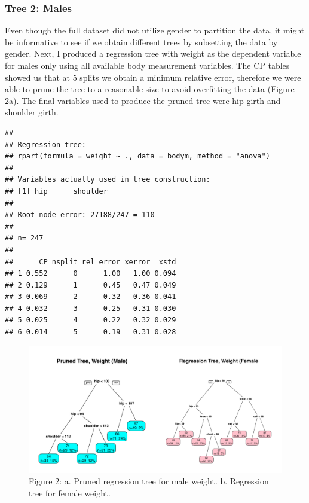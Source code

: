 \documentclass[11pt]{article}\usepackage[]{graphicx}\usepackage[]{color}
\makeatletter
\def\maxwidth{ %
  \ifdim\Gin@nat@width>\linewidth
    \linewidth
  \else
    \Gin@nat@width
  \fi
}
\newenvironment{kframe}{%
 \def\at@end@of@kframe{}%
 \ifinner\ifhmode%
  \def\at@end@of@kframe{\end{minipage}}%
  \begin{minipage}{\columnwidth}%
 \fi\fi%
 \def\FrameCommand##1{\hskip\@totalleftmargin \hskip-\fboxsep
 \colorbox{shadecolor}{##1}\hskip-\fboxsep
     \hskip-\linewidth \hskip-\@totalleftmargin \hskip\columnwidth}%
 \MakeFramed {\advance\hsize-\width
   \@totalleftmargin\z@ \linewidth\hsize
   \@setminipage}}%
 {\par\unskip\endMakeFramed%
 \at@end@of@kframe}
\newenvironment{knitrout}{}{} %
\makeatother
\begin{document}
\subsubsection{Tree 2: Males} 
Even though the full dataset did not utilize gender to partition the data, it might be informative to see if we obtain different trees by subsetting the data by gender. Next, I produced a regression tree with weight as the dependent variable for males only using all available body measurement variables. The CP tables showed us that at 5 splits we obtain a minimum relative error, therefore we were able to prune the tree to a reasonable size to avoid overfitting the data (Figure 2a). The final variables used to produce the pruned tree were hip girth and shoulder girth.

\begin{knitrout}
\color{fgcolor}\begin{kframe}
\begin{verbatim}
## 
## Regression tree:
## rpart(formula = weight ~ ., data = bodym, method = "anova")
## 
## Variables actually used in tree construction:
## [1] hip      shoulder
## 
## Root node error: 27188/247 = 110
## 
## n= 247 
## 
##      CP nsplit rel error xerror  xstd
## 1 0.552      0      1.00   1.00 0.094
## 2 0.129      1      0.45   0.47 0.049
## 3 0.069      2      0.32   0.36 0.041
## 4 0.032      3      0.25   0.31 0.030
## 5 0.025      4      0.22   0.32 0.029
## 6 0.014      5      0.19   0.31 0.028
\end{verbatim}
\end{kframe}
\end{knitrout}

\begin{figure}
\begin{knitrout}
\color{fgcolor}
\includegraphics[width=\maxwidth]{figure/mtrees} 

\end{knitrout}

\caption{Figure 2: a. Pruned regression tree for male weight. b. Regression tree for female weight.}
\end{figure}
\end{document}
